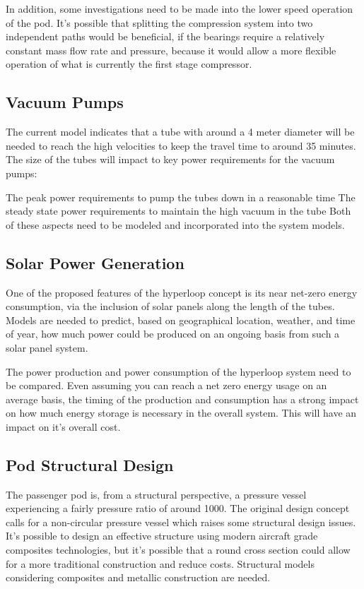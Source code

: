 \documentclass[heading.tex]{subfiles}
\begin{document}
In addition, some investigations need to be made into the lower speed operation of the pod. It's possible that splitting the compression
system into two independent paths would be beneficial, if the bearings require a relatively constant mass flow rate and pressure, because it
would allow a more flexible operation of what is currently the first stage compressor.



\subsection{Vacuum Pumps}
The current model indicates that a tube with around a 4 meter diameter will be needed to reach the high velocities to keep the travel time
to around 35 minutes. The size of the tubes will impact to key power requirements for the vacuum pumps:

The peak power requirements to pump the tubes down in a reasonable time
The steady state power requirements to maintain the high vacuum in the tube
Both of these aspects need to be modeled and incorporated into the system models.


\subsection{Solar Power Generation}
One of the proposed features of the hyperloop concept is its near net-zero energy consumption, via the inclusion of solar panels along the
length of the tubes. Models are needed to predict, based on geographical location, weather, and time of year, how much power could be
produced on an ongoing basis from such a solar panel system.

The power production and power consumption of the hyperloop system need to be compared. Even assuming you can reach a net zero
energy usage on an average basis, the timing of the production and consumption has a strong impact on how much energy storage is
necessary in the overall system. This will have an impact on it's overall cost.

\subsection{Pod Structural Design}
The passenger pod is, from a structural perspective, a pressure vessel experiencing a fairly pressure ratio of around 1000. The original
design concept calls for a non-circular pressure vessel which raises some structural design issues. It's possible to design an effective
structure using modern aircraft grade composites technologies, but it's possible that a round cross section could allow for a more
traditional construction and reduce costs. Structural models considering composites and metallic construction are needed.
\end{document}
